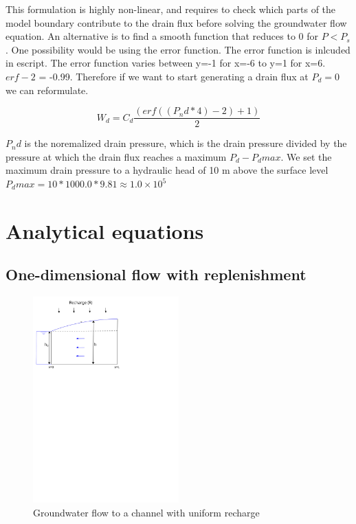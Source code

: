 \documentclass[11pt]{article}
\begin{document}
This formulation is highly non-linear, and requires to check which parts of the model boundary contribute to the drain flux before solving the groundwater flow equation. An alternative is to find a smooth function that reduces to $0$ for $P < P_s$. One possibility would be using the error function. The error function is inlcuded in escript. The error function varies between y=-1 for x=-6 to y=1 for x=6. $erf -2$ = -0.99. Therefore if we want to start generating a drain flux at $P_d = 0$ we can reformulate.

\begin{equation}
	W_d = C_d \frac{(erf ((P_nd*4) - 2) +1 )}{2}
\end{equation}

$P_nd$ is the noremalized drain pressure, which is the drain pressure divided by the pressure at which the drain flux reaches a maximum $P_d - P_dmax$. We set the maximum drain pressure to a hydraulic head of 10 m above the surface level $P_dmax = 10 * 1000.0 * 9.81 \approx 1.0 \times 10^5$



\pagebreak

\section{Analytical equations}

\subsection{One-dimensional flow with replenishment}

\begin{figure}[ht]
    \includegraphics[width=0.5\textwidth]{fig/1dim_flow_with_recharge}
    \caption{Groundwater flow to a channel with uniform recharge}
    \label{fig:1d_gwflow}
\end{figure}
\end{document}
